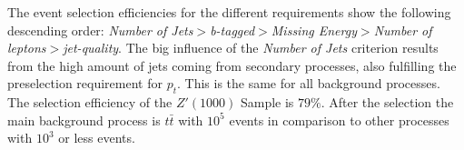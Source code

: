 The event selection efficiencies for the different requirements show the following descending order: \emph{Number of Jets}$>$\emph{b-tagged}$>$\emph{Missing Energy}$>$\emph{Number of leptons}$>$\emph{jet-quality}. The big influence of the \emph{Number of Jets} criterion results from the high amount of jets coming from secondary processes, also fulfilling the preselection requirement for $p_t$. This is the same for all background processes. The selection efficiency of the $Z'(1000)$ Sample is $79\%$. After the selection the main background process is $t\bar t$ with $10^5$ events in comparison to other processes with $10^3$ or less events.
	

